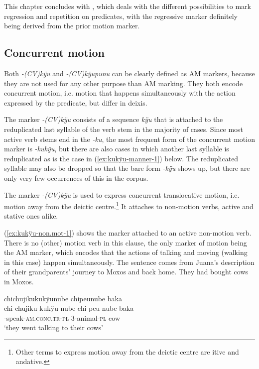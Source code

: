 This chapter concludes with , which deals with the different possibilities to mark regression and repetition on predicates, with the regressive marker definitely being derived from the prior motion marker.


\subsection{Concurrent motion}\label{sec:AMconcurrent}

Both \textit{-(CV)kÿu} and \textit{-(CV)kÿupunu} can be clearly defined as AM markers, because they are not used for any other purpose than AM marking. They both encode concurrent motion, i.e. motion that happens simultaneously with the action expressed by the predicate, but differ in deixis.

The marker \textit{-(CV)kÿu} consists of a sequence \textit{kÿu} that is attached to the reduplicated last syllable of the verb stem in the majority of cases. Since most active verb stems end in the  \textit{-ku}, the most frequent form of the concurrent motion marker is \textit{-kukÿu}, but there are also cases in which another last syllable is reduplicated as is the case in (\ref{ex:kukÿu-manner-1}) below. The reduplicated syllable may also be dropped so that the bare form \textit{-kÿu} shows up, but there are only very few occurrences of this in the corpus. %

The marker \textit{-(CV)kÿu} is used to express concurrent translocative motion, i.e. motion away from the deictic centre.\footnote{Other terms to express motion away from the deictic centre are itive and andative.} It attaches to non-motion verbs, active and stative ones alike. 

(\ref{ex:kukÿu-non.mot-1}) shows the marker attached to an active non-motion verb. There is no (other) motion verb in this clause, the only marker of motion being the AM marker, which encodes that the actions of talking and moving (walking in this case) happen simultaneously. The sentence comes from Juana’s description of their grandparents’ journey to Moxos and back home. They had bought cows in Moxos.

\ea\label{ex:kukÿu-non.mot-1}
\begingl 
\glpreamble chichujikukukÿunube chipeunube baka\\
\gla chi-chujiku-kukÿu-nube chi-peu-nube baka\\ 
-speak-\textsc{am.conc.tr}-\textsc{pl} 3-animal-\textsc{pl} cow\\ 
\glft ‘they went talking to their cows’
\trailingcitation{[jxx-p151016l-2]}
\xe


